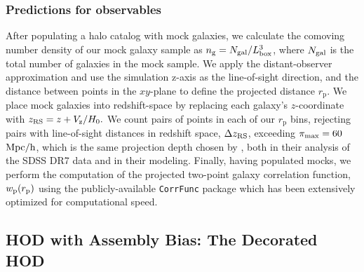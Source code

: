 \documentclass[usenatbib,usegraphicx,letterpaper]{mn2e}
\newcommand{\rp}{r_{\mathrm{p}}}
\begin{document}
\subsubsection{Predictions for observables}

After populating a halo catalog with mock galaxies, we calculate the
comoving number density of our mock galaxy sample as $n_{\rm g} =
N_{\rm gal} / L_{\rm box}^3$, where $N_{\rm gal}$ is the total number of
galaxies in the mock sample. We apply the distant-observer
approximation and use the simulation z-axis as the line-of-sight
direction, and the distance between points in the $xy$-plane to define
the projected distance $\rp.$ We place mock galaxies into
redshift-space by replacing each galaxy's $z$-coordinate with
$z_{\rm RS} = z + V_{\rm z}/H_0.$ We count pairs of points in each of
our $\rp$ bins, rejecting pairs with line-of-sight distances in redshift space, $\Delta z_{\rm RS}$, 
exceeding $\pi_{\rm max}=60$ ${\rm Mpc/h}$, which is the same projection
depth chosen by \citet{zehavi_etal11}, both in their analysis of the SDSS
DR7 data and in their modeling. Finally, having populated mocks, 
we perform the computation of the projected two-point galaxy correlation 
function, $w_{\rm p}(r_{\rm p})$ using the publicly-available {\tt CorrFunc} 
package \citep{corrfunc} which has been extensively optimized for computational speed.

\subsection{HOD with Assembly Bias: The Decorated HOD}
\label{subsection:decorated}
\end{document}
